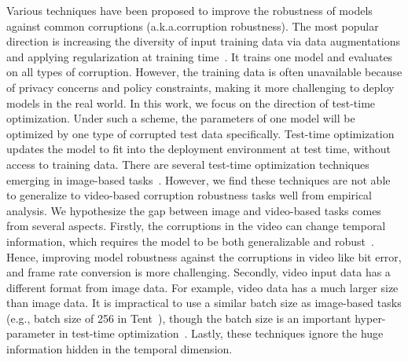 \documentclass{article} %
\begin{document}

Various techniques have been proposed to improve the robustness of models against common corruptions (a.k.a.corruption robustness). The most popular direction is increasing the diversity of input training data via data augmentations and applying regularization at training time~\citep{zheng2016improving,wang2021augmax,hendrycks2019augmix,rusak2020increasing, wang2020heterogeneous}.
It trains one model and evaluates on all types of corruption. 
However, the training data is often unavailable because of privacy concerns and policy constraints, making it more challenging to deploy models in the real world. 
In this work, we focus on the direction of test-time optimization. 
Under such a scheme, the parameters of one model will be optimized by one type of corrupted test data specifically. 
Test-time optimization updates the model to fit into the deployment environment at test time, without access to training data.    
There are several test-time optimization techniques emerging in image-based tasks~\citep{wang2020tent,schneider2020improving,pmlr-v119-liang20a,sun2020test}. 
However, we find these techniques are not able to generalize to video-based corruption robustness tasks well from empirical analysis. 
We hypothesize the gap between image and video-based tasks comes from several aspects.
Firstly, the corruptions in the video can change temporal information, which requires the model to be both generalizable and robust~\citep{yi2021benchmarking}. 
Hence, improving model robustness against the corruptions in video like bit error, and frame rate conversion is more challenging.
Secondly, video input data has a different format from image data. For example, video data has a much larger size than image data. 
It is impractical to use a similar batch size as image-based tasks (e.g., batch size of 256 in Tent~\citep{wang2020tent}), though the batch size is an important hyper-parameter in test-time optimization~\citep{wang2020tent,schneider2020improving}. 
Lastly, these techniques ignore the huge information hidden in the temporal dimension.   
\end{document}
